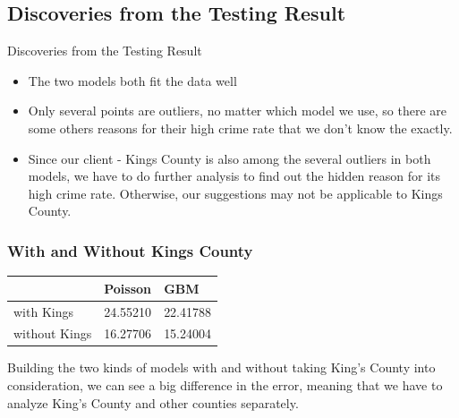 \documentclass{beamer}
\begin{document}
\subsection{Discoveries from the Testing Result}
\begin{frame}{Discoveries from the Testing Result}
\begin{itemize}
\item The two models both fit the data well
\item Only several points are outliers, no matter which model we use, so there are some others reasons for their high crime rate that we don't know the exactly.
\item Since our client - Kings County is also among the several outliers in both models, we have to do further analysis to find out the hidden reason for its high crime rate. Otherwise, our suggestions may not be applicable to Kings County.
\end{itemize}

\end{frame}



\begin{frame}[fragile]
\frametitle{With and Without Kings County}

 \begin{center}
 \begin{tabular}{ p{3cm}p{2cm}p{2cm}}
 {} &Poisson &GBM \\
 \hline
with Kings  &24.55210 &22.41788\\
without Kings &16.27706 &15.24004\\
 \end{tabular}
 \end{center}

 \bigbreak
 \bigbreak


Building the two kinds of models with and without taking King's County into consideration, we can see a big difference in the error, meaning that we have to analyze King's County and other counties separately.
\end{frame}
\end{document}
